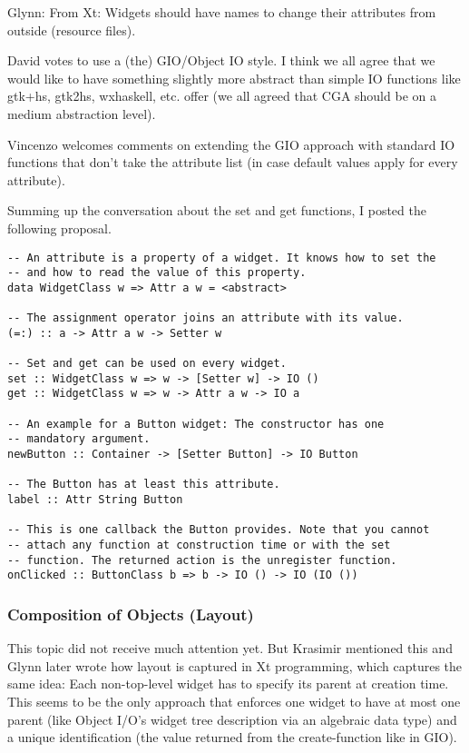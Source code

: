 \documentclass{article}
\begin{document}
Glynn: From Xt: Widgets should have names to change their attributes
from outside (resource files).

David votes to use a (the) GIO/Object IO style. I think we all agree
that we would like to have something slightly more abstract than
simple IO functions like gtk+hs, gtk2hs, wxhaskell, etc. offer (we all
agreed that CGA should be on a medium abstraction level).

Vincenzo welcomes comments on extending the GIO approach with standard
IO functions that don't take the attribute list (in case default
values apply for every attribute).

Summing up the conversation about the set and get functions, I posted
the following proposal.

\begin{verbatim}
-- An attribute is a property of a widget. It knows how to set the
-- and how to read the value of this property.
data WidgetClass w => Attr a w = <abstract>

-- The assignment operator joins an attribute with its value.
(=:) :: a -> Attr a w -> Setter w

-- Set and get can be used on every widget.
set :: WidgetClass w => w -> [Setter w] -> IO ()
get :: WidgetClass w => w -> Attr a w -> IO a

-- An example for a Button widget: The constructor has one
-- mandatory argument.
newButton :: Container -> [Setter Button] -> IO Button

-- The Button has at least this attribute.
label :: Attr String Button

-- This is one callback the Button provides. Note that you cannot
-- attach any function at construction time or with the set
-- function. The returned action is the unregister function.
onClicked :: ButtonClass b => b -> IO () -> IO (IO ())
\end{verbatim}

\subsubsection{\label{secParentAsParameter} Composition of Objects
  (Layout)}

This topic did not receive much attention yet. But Krasimir mentioned
this and Glynn later wrote how layout is captured in Xt programming,
which captures the same idea: Each non-top-level widget has to specify
its parent at creation time. This seems to be the only approach that
enforces one widget to have at most one parent (like Object I/O's
widget tree description via an algebraic data type) and a unique
identification (the value returned from the create-function like in
GIO).
\end{document}
